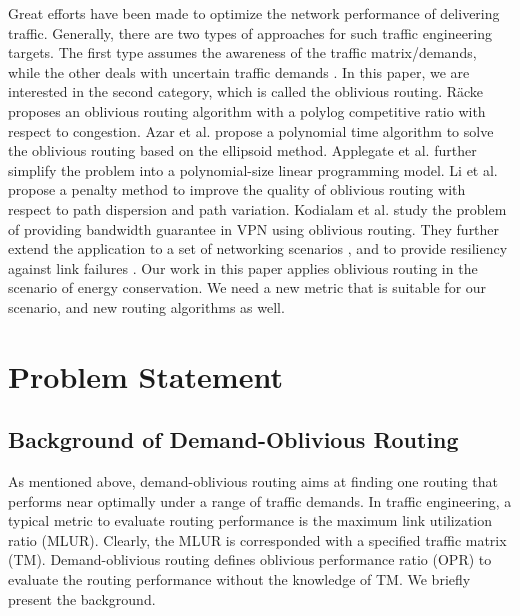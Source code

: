 \documentclass[conference]{IEEEtran}
\begin{document}
Great efforts have been made to optimize the network performance of delivering traffic. Generally, there are two types of approaches for such traffic engineering targets. The first type assumes the awareness of the traffic matrix/demands, while the other deals with uncertain traffic demands \cite{DynamicVSOblivious11Algorithmica}. In this paper, we are interested in the second category, which is called the oblivious routing. R\"{a}cke \cite{networking:minimize} proposes an oblivious routing algorithm with a polylog competitive ratio with respect to congestion. Azar et al. \cite{networking:polynomial} propose a polynomial time algorithm to solve the oblivious routing based on the ellipsoid method. Applegate \cite{networking:oblivious} et al. further simplify the problem into a polynomial-size linear programming model. Li et al. \cite{ASimpleMethodBalancing05ICCCN} propose a penalty method to improve the quality of oblivious routing with respect to path dispersion and path variation. Kodialam et al. \cite{TrafficOblivious07CommuMagazine} study the problem of providing bandwidth guarantee in VPN using oblivious routing. They further extend the application to a set of networking scenarios \cite{ObliviousHighVariable08TON}, and to provide resiliency against link failures \cite{ObliviousHoseModel11TON}. Our work in this paper applies oblivious routing in the scenario of energy conservation. We need a new metric that is suitable for our scenario, and new routing algorithms as well.

\section{Problem Statement}
\label{problem_statement}

\subsection{Background of Demand-Oblivious Routing}

As mentioned above, demand-oblivious routing aims at finding one routing that performs near optimally under a range of traffic demands. In traffic engineering, a typical metric to evaluate routing performance is the maximum link utilization ratio (MLUR). Clearly, the MLUR is corresponded with a specified traffic matrix (TM). Demand-oblivious routing defines oblivious performance ratio (OPR) to evaluate the routing performance without the knowledge of TM. We briefly present the background.
\end{document}
